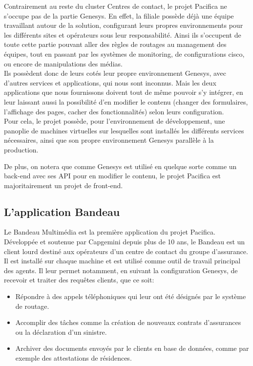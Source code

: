\documentclass{rapport}
\begin{document}
Contrairement au reste du cluster Centres de contact, le projet Pacifica ne s'occupe pas de la partie Genesys. En effet, la filiale possède déjà une équipe travaillant autour de la solution, configurant leurs propres environnements pour les différents sites et opérateurs sous leur responsabilité. Ainsi ils s'occupent de toute cette partie pouvant aller des règles de routages au management des équipes, tout en passant par les systèmes de monitoring, de configurations cisco, ou encore de manipulations des médias.\\

Ils possèdent donc de leurs cotés leur propre environnement Genesys, avec d'autres services et applications, qui nous sont inconnus. Mais les deux applications que nous fournissons doivent tout de même pouvoir s'y intégrer, en leur laissant aussi la possibilité d'en modifier le contenu (changer des formulaires, l'affichage des pages, cacher des fonctionnalités) selon leurs configuration.\\
Pour cela, le projet possède, pour l'environnement de développement, une panoplie de machines virtuelles sur lesquelles sont installés les différents services nécessaires, ainsi que son propre environnement Genesys parallèle à la production.

De plus, on notera que comme Genesys est utilisé en quelque sorte comme un back-end avec ses API pour en modifier le contenu, le projet Pacifica est majoritairement un projet de front-end.\\

\subsection{L'application Bandeau}

Le Bandeau Multimédia est la première application du projet Pacifica. Développée et soutenue par Capgemini depuis plus de 10 ans, le Bandeau est un client lourd destiné aux opérateurs d'un centre de contact du groupe d'assurance. Il est installé sur chaque machine et est utilisé comme outil de travail principal des agents. Il leur permet notamment, en suivant la configuration Genesys, de recevoir et traiter des requêtes clients, que ce soit:\\

\begin{itemize}
\item Répondre à des appels téléphoniques qui leur ont été désignés par le système de routage.
\item Accomplir des tâches comme la création de nouveaux contrats d'assurances ou la déclaration d'un sinistre.
\item Archiver des documents envoyés par le clients en base de données, comme par exemple des attestations de résidences.
\end{itemize}
\end{document}
